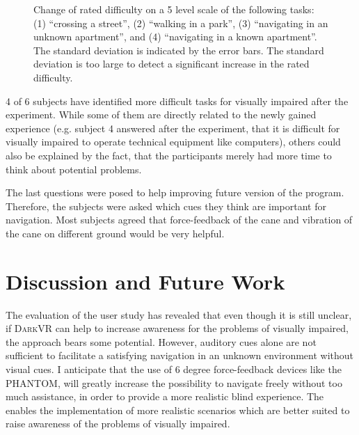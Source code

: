 \documentclass{sig-alternate}
\newcommand{\darkvr}{\textsc{DarkVR}\xspace}
\begin{document}
\begin{figure}[tb]
\centering


\caption{Change of rated difficulty on a 5 level scale of the following tasks:
(1) ``crossing a street'', (2) ``walking in a park'', (3) ``navigating in an unknown apartment'',
and (4) ``navigating in a known apartment''. The standard deviation is indicated
by the error bars. The standard deviation is too large to detect a significant
increase in the rated difficulty.}

\label{fig:results}
\end{figure}

4 of 6 subjects have identified more difficult tasks for visually impaired after
the experiment. While some of them are directly related to the newly gained
experience (e.g. subject 4 answered after the experiment, that it is difficult
for visually impaired to operate technical equipment like computers), others
could also be explained by the fact, that the participants merely had more time to
think about potential problems.

The last questions were posed to help improving future version of the program.
Therefore, the subjects were asked which cues they think are important for
navigation. Most subjects agreed that force-feedback of the cane and vibration
of the cane on different ground would be very helpful.

\section{Discussion and Future Work}
\label{sec:conclusion}

The evaluation of the user study has revealed that even though it is still
unclear, if \darkvr can help to increase awareness for the problems of visually
impaired, the approach bears some potential. However, auditory cues alone are
not sufficient to facilitate a satisfying navigation in an unknown environment
without visual cues. I anticipate that the use of 6 degree force-feedback
devices like the PHANTOM\cite{phantom}, will greatly increase the possibility to
navigate freely without too much assistance, in order to provide a more
realistic blind experience. The enables the implementation of more realistic
scenarios which are better suited to raise awareness of the problems of visually
impaired.
\end{document}
